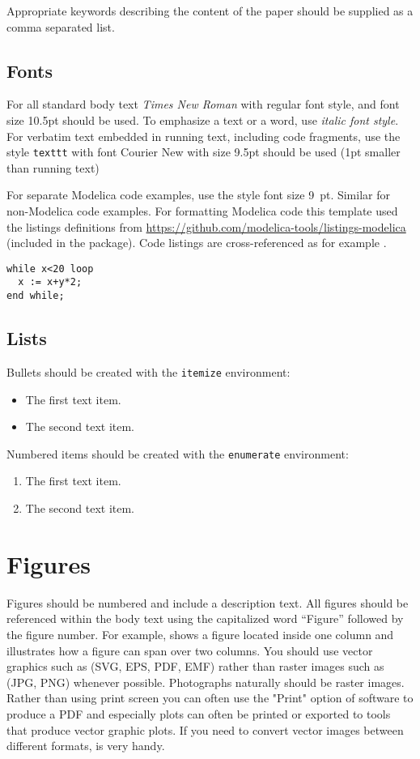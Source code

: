 \documentclass{modelica}
\begin{document}
Appropriate keywords describing the content of the paper should be
supplied as a comma separated list.

\subsection{Fonts}

For all standard body text \emph{Times New Roman} with regular font style, and font size 10.5pt should be used. To emphasize a text or a word, use \emph{italic font style}. For verbatim text embedded in running text, including code fragments, use the style {\small\texttt{texttt}} with font Courier New with size 9.5pt should be used (1pt smaller than running text)

For separate Modelica code examples, use the style font size 9~pt.
Similar for non-Modelica code examples.
For formatting Modelica code this template used the listings definitions from {\small\url{https://github.com/modelica-tools/listings-modelica}} (included in the package).
Code listings are cross-referenced as for example .

\begin{lstlisting}[caption=A while loop,label=lst:while-loop]
while x<20 loop
  x := x+y*2;
end while;
\end{lstlisting}

\subsection{Lists}

Bullets should be created with the \texttt{itemize} environment:
\begin{itemize}
\item The first text item.
\item The second text item.
\end{itemize}
Numbered items should be created with the \texttt{enumerate} environment:
\begin{enumerate}
\item The first text item.
\item The second text item.
\end{enumerate}

\section{Figures}

Figures should be numbered and include a description text. All figures
should be referenced within the body text using the capitalized word
``Figure'' followed by the figure number. For example,
 shows a figure located inside one column and
 illustrates how a figure can span over two
columns.
You should use vector graphics such as (SVG, EPS, PDF, EMF) rather than raster images such as (JPG, PNG) whenever possible.
Photographs naturally should be raster images.
Rather than using print screen you can often use the "Print" option of software to produce a PDF and especially plots can often be printed or exported to tools that produce vector graphic plots.
If you need to convert vector images between different formats, \textcite{inkscape} is very handy.
\end{document}
